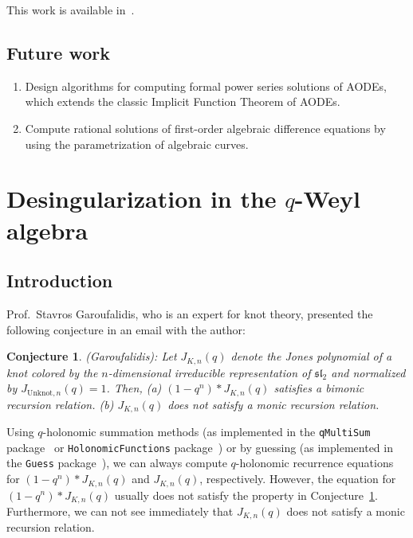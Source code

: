 \documentclass[10pt,a4paper]{article}
\newtheorem{conj}[thm]{Conjecture}
\begin{document}
This work is available in~\cite{VoZhang2017}.

\subsection{Future work}

\begin{enumerate}
 \item Design algorithms for computing formal power series solutions of AODEs, which extends the classic Implicit Function Theorem of AODEs.
 \item Compute rational solutions of first-order algebraic difference equations by using the parametrization of algebraic curves.  
\end{enumerate}


\section{Desingularization in the \texorpdfstring{$q$}{q}-Weyl algebra} \label{SECT:qdesing}

\subsection{Introduction}

Prof.\ Stavros Garoufalidis, who is an expert for knot theory, 
presented the following conjecture in an email with the author:

\begin{conj} \label{CONJ:stavros}
(Garoufalidis): Let $J_{K,n}(q)$ denote the Jones polynomial of a knot colored by the $n$-dimensional irreducible 
representation of $\mathfrak{sl}_2$ and normalized by $J_{\text{Unknot},n}(q)=1$. 
Then, (a) $(1-q^n)*J_{K,n}(q)$ satisfies a bimonic recursion relation. (b) $J_{K,n}(q)$ does not satisfy a monic recursion relation.
\end{conj}

Using $q$-holonomic summation methods (as implemented in the \texttt{qMultiSum}
package~\cite{Riese03} or \texttt{HolonomicFunctions}
package~\cite{Christoph2010}) or by guessing (as implemented in the
\texttt{Guess} package~\cite{Kauers2009a}), 
we can always compute $q$-holonomic recurrence equations for $(1-q^n)*J_{K,n}(q)$ and $J_{K,n}(q)$, respectively. 
However, the equation for $(1-q^n)*J_{K,n}(q)$ usually does not satisfy the property in Conjecture~\ref{CONJ:stavros}. 
Furthermore, we can not see immediately that $J_{K,n}(q)$ does not satisfy a monic recursion relation.
\end{document}
